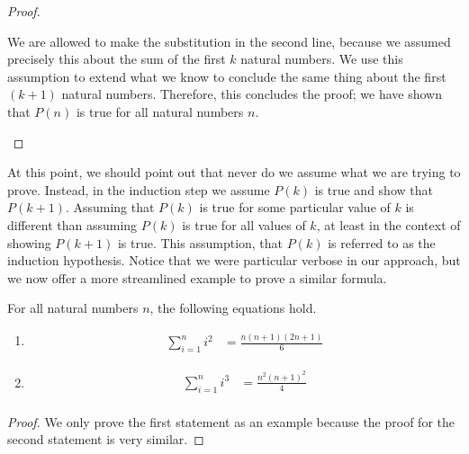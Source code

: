\documentclass[twoside]{report}
\begin{document}
\begin{proof}
\begin{enumerate}
		We are allowed to make the substitution in the second line, because we assumed precisely this about the sum of the first $k$ natural numbers. We use this assumption to extend what we know to conclude the same thing about the first $(k + 1)$ natural numbers. Therefore, this concludes the proof; we have shown that $P(n)$ is true for all natural numbers $n$.
	\end{enumerate}
	\vspace{\baselineskip}
\end{proof}
\vspace{\baselineskip}

At this point, we should point out that never do we assume what we are trying to prove. Instead, in the induction step we assume $P(k)$ is true and show that $P(k + 1)$. Assuming that $P(k)$ is true for some particular value of $k$ is different than assuming $P(k)$ is true for all values of $k$, at least in the context of showing $P(k + 1)$ is true. This assumption, that $P(k)$ is referred to as the induction hypothesis. Notice that we were particular verbose in our approach, but we now offer a more streamlined example to prove a similar formula.


\vspace{\baselineskip}
\begin{theorem}
	For all natural numbers $n$, the following equations hold.
	
	\begin{enumerate}
		\item 
		\begin{align*}
			\sum_{i = 1}^n i^2 &= \frac{n(n + 1)(2n + 1)}{6}
		\end{align*}
		\item 
		\begin{align*}
			\sum_{i = 1}^n i^3 &= \frac{n^2(n + 1)^2}{4} \\
		\end{align*}
	\end{enumerate}
\end{theorem}
\begin{proof}
	We only prove the first statement as an example because the proof for the second statement is very similar. 
\end{proof}
\vspace{\baselineskip}


\end{document}
